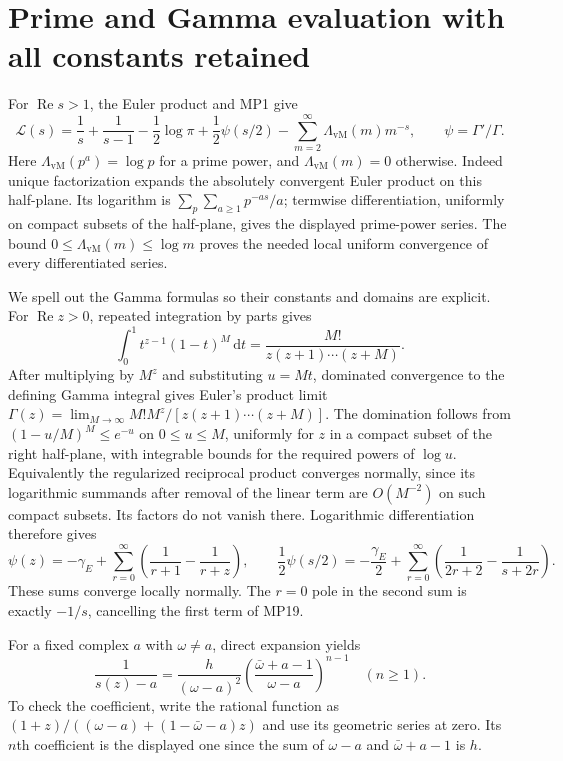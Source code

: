\documentclass[11pt]{article}
\newcommand{\LL}{\mathscr L}
\newcommand{\dd}{\,\mathrm d}
\newcommand{\Rea}{\operatorname{Re}}
\newcommand{\vM}{\Lambda_{\mathrm{vM}}}
\begin{document}
\section{Prime and Gamma evaluation with all constants retained}
For $\Rea s>1$, the Euler product and MP1 give
\begin{equation}
 \LL(s)=\frac1s+\frac1{s-1}-\frac12\log\pi
           +\frac12\psi(s/2)-\sum_{m=2}^\infty\vM(m)m^{-s},
 \qquad \psi=\Gamma'/\Gamma.\tag{MP19}
\end{equation}
Here $\vM(p^a)=\log p$ for a prime power, and $\vM(m)=0$ otherwise.
Indeed unique factorization expands the absolutely convergent Euler
product on this half-plane. Its logarithm is
$\sum_p\sum_{a\geq1}p^{-as}/a$; termwise differentiation, uniformly
on compact subsets of the half-plane, gives the displayed prime-power
series. The bound $0\leq\vM(m)\leq\log m$ proves the needed local
uniform convergence of every differentiated series.

We spell out the Gamma formulas so their constants and domains are
explicit. For $\Rea z>0$, repeated integration by parts gives
\[
 \int_0^1t^{z-1}(1-t)^M\dd t
       =\frac{M!}{z(z+1)\cdots(z+M)}.
\]
After multiplying by $M^z$ and substituting $u=Mt$, dominated
convergence to the defining Gamma integral gives Euler's product limit
$\Gamma(z)=\lim_{M\to\infty}M!M^z/[z(z+1)\cdots(z+M)]$.
The domination follows from $(1-u/M)^M\leq e^{-u}$ on $0\leq u\leq M$,
uniformly for $z$ in a compact subset of the right half-plane, with
integrable bounds for the required powers of $\log u$.
Equivalently the regularized reciprocal product converges normally,
since its logarithmic summands after removal of the linear term are
$O(M^{-2})$ on such compact subsets. Its factors do not vanish there.
Logarithmic differentiation therefore gives
\begin{equation}
 \psi(z)=-\gamma_E+\sum_{r=0}^\infty
                   \left(\frac1{r+1}-\frac1{r+z}\right),
 \qquad
 \frac12\psi(s/2)=-\frac{\gamma_E}2+
       \sum_{r=0}^\infty\left(\frac1{2r+2}-\frac1{s+2r}\right).
 \tag{MP20}
\end{equation}
These sums converge locally normally. The $r=0$ pole in the second
sum is exactly $-1/s$, cancelling the first term of MP19.

For a fixed complex $a$ with $\omega\ne a$, direct expansion yields
\begin{equation}
 [z^n]\frac1{s(z)-a}
 =\frac h{(\omega-a)^2}
       \left(\frac{\bar\omega+a-1}{\omega-a}\right)^{n-1}
 \quad(n\geq1).\tag{MP21}
\end{equation}
To check the coefficient, write the rational function as
$(1+z)/((\omega-a)+(1-\bar\omega-a)z)$ and use its geometric series
at zero. Its $n$th coefficient is the displayed one since the sum of
$\omega-a$ and $\bar\omega+a-1$ is $h$.
\end{document}
